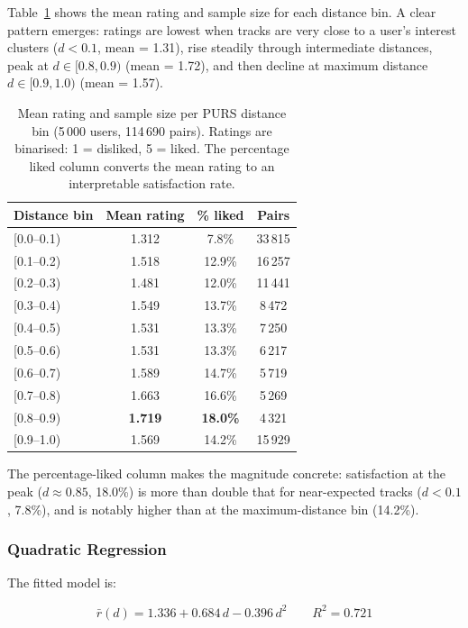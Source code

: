 Table~\ref{tab:exp1_bins} shows the mean rating and sample size for each
distance bin.  A clear pattern emerges: ratings are lowest when tracks are
very close to a user's interest clusters ($d < 0.1$, mean = 1.31), rise
steadily through intermediate distances, peak at $d \in [0.8, 0.9)$ (mean =
1.72), and then decline at maximum distance $d \in [0.9, 1.0)$ (mean = 1.57).

\begin{table}[h]
\centering
\caption{Mean rating and sample size per PURS distance bin (5\,000 users,
         114\,690 pairs). Ratings are binarised: 1 = disliked, 5 = liked.
         The percentage liked column converts the mean rating to an
         interpretable satisfaction rate.}
\label{tab:exp1_bins}
\begin{tabular}{lccc}
\toprule
\textbf{Distance bin} & \textbf{Mean rating} & \textbf{\% liked} & \textbf{Pairs} \\
\midrule
{[0.0--0.1)} & 1.312 &  7.8\% & 33\,815 \\
{[0.1--0.2)} & 1.518 & 12.9\% & 16\,257 \\
{[0.2--0.3)} & 1.481 & 12.0\% & 11\,441 \\
{[0.3--0.4)} & 1.549 & 13.7\% &  8\,472 \\
{[0.4--0.5)} & 1.531 & 13.3\% &  7\,250 \\
{[0.5--0.6)} & 1.531 & 13.3\% &  6\,217 \\
{[0.6--0.7)} & 1.589 & 14.7\% &  5\,719 \\
{[0.7--0.8)} & 1.663 & 16.6\% &  5\,269 \\
{[0.8--0.9)} & \textbf{1.719} & \textbf{18.0\%} &  4\,321 \\
{[0.9--1.0)} & 1.569 & 14.2\% & 15\,929 \\
\bottomrule
\end{tabular}
\end{table}

\noindent
The percentage-liked column makes the magnitude concrete: satisfaction at the
peak ($d \approx 0.85$, 18.0\%) is more than double that for near-expected
tracks ($d < 0.1$, 7.8\%), and is notably higher than at the maximum-distance
bin (14.2\%).

\subsubsection{Quadratic Regression}

The fitted model is:

\begin{equation}
    \bar{r}(d) = 1.336 + 0.684\,d - 0.396\,d^2
    \qquad R^2 = 0.721
    \label{eq:exp1_fit}
\end{equation}

